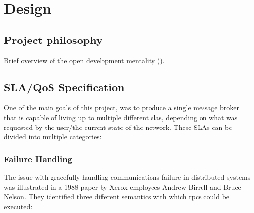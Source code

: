 \section{Design}
\label{sec:Design}

\subsection{Project philosophy}
\label{sub:Project philosophy}

Brief overview of the open development mentality ().

\subsection{SLA/QoS Specification}
\label{sub:SLA/QoS Specification}

One of the main goals of this project, was to produce a single message broker that
is capable of living up to multiple different \glspl{sla}, depending on what was
requested by the user/the current state of the network. These SLAs can be divided
into multiple categories:

\subsubsection{Failure Handling}
\label{subs:Failure Handling}

The issue with gracefully handling communications failure in distributed systems
was illustrated in a 1988 paper by Xerox employees
Andrew Birrell and Bruce Nelson\cite{Birrell:1988:IRP:59309.59336}. They identified
three different semantics with which \glspl{rpc} could be executed:

